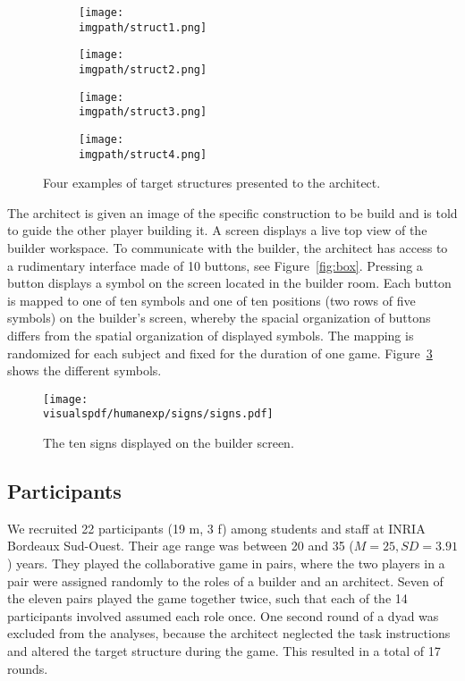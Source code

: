 \begin{figure}[!htbp]
    \centering
    \begin{subfigure}[b]{0.24\columnwidth}
        \centering
        \texttt{[image: \\imgpath/struct1.png]}
        \caption{}
    \end{subfigure}
    \begin{subfigure}[b]{0.74\columnwidth}
        \centering
        \texttt{[image: \\imgpath/struct2.png]}
        \caption{}
    \end{subfigure}
    \begin{subfigure}[b]{0.49\columnwidth}
        \centering
        \texttt{[image: \\imgpath/struct3.png]}
        \caption{}
        \label{fig:sc}
    \end{subfigure}
    \begin{subfigure}[b]{0.49\columnwidth}
        \centering
        \texttt{[image: \\imgpath/struct4.png]}
        \caption{}
    \end{subfigure}
    \caption{Four examples of target structures presented to the architect.} 
    \label{fig:structures}
\end{figure}

The architect is given an image of the specific construction to be build and is told to guide the other player building it. A screen displays a live top view of the builder workspace. To communicate with the builder, the architect has access to a rudimentary interface made of 10 buttons, see Figure~\ref{fig:box}. Pressing a button displays a symbol on the screen located in the builder room. Each button is mapped to one of ten symbols and one of ten positions (two rows of five symbols) on the builder's screen, whereby the spacial organization of buttons differs from the spatial organization of displayed symbols. The mapping is randomized for each subject and fixed for the duration of one game. Figure~\ref{fig:sign} shows the different symbols.

\begin{figure}[!htbp]
\centering
\texttt{[image: \\visualspdf/humanexp/signs/signs.pdf]}
\caption{The ten signs displayed on the builder screen.}
\label{fig:sign}
\end{figure}

\subsection{Participants}

We recruited 22 participants (19 m, 3 f) among students and staff at INRIA Bordeaux Sud-Ouest. Their age range was between 20 and 35 ($M = 25, SD = 3.91$) years. They played the collaborative game in pairs, where the two players in a pair were assigned randomly to the roles of a builder and an architect. Seven of the eleven pairs played the game together twice, such that each of the 14 participants involved assumed each role once. One second round of a dyad was excluded from the analyses, because the architect neglected the task instructions and altered the target structure during the game. This resulted in a total of 17 rounds.

